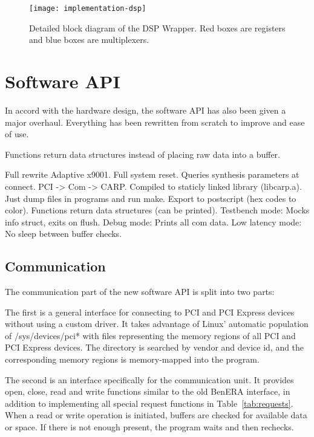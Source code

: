 \begin{figure}[!ht]
    \centering
    \texttt{[image: implementation-dsp]}
    \caption[DSP Wrapper]{
        Detailed block diagram of the DSP Wrapper.
        Red boxes are registers and blue boxes are multiplexers.
    }
    \label{fig:implementation-dsp}
\end{figure}


\section{Software API}

In accord with the hardware design, the software API has also been given a major overhaul.
Everything has been rewritten from scratch to improve \TODO and ease of use.

Functions return data structures instead of placing raw data into a buffer.

\TODO
Full rewrite
Adaptive x9001.
Full system reset.
Queries synthesis parameters at connect.
PCI -> Com -> CARP.
Compiled to staticly linked library (libcarp.a).
Just dump files in programs and run make.
Export to postscript (hex codes to color).
Functions return data structures (can be printed).
Testbench mode: Mocks info struct, exits on flush.
Debug mode: Prints all com data.
Low latency mode: No sleep between buffer checks.

\subsection{Communication}

The communication part of the new software API is split into two parts:

The first is a general interface for connecting to PCI and PCI Express devices without using a custom driver.
It takes advantage of Linux' automatic population of /sys/devices/pci* with files representing the memory regions of all PCI and PCI Express devices.
The directory is searched by vendor and device id, and the corresponding memory regions is memory-mapped into the program.

The second is an interface specifically for the communication unit.
It provides open, close, read and write functions similar to the old BenERA interface, in addition to implementing all special request functions in Table~\ref{tab:requests}.
When a read or write operation is initiated, buffers are checked for available data or space.
If there is not enough present, the program waits and then rechecks.

